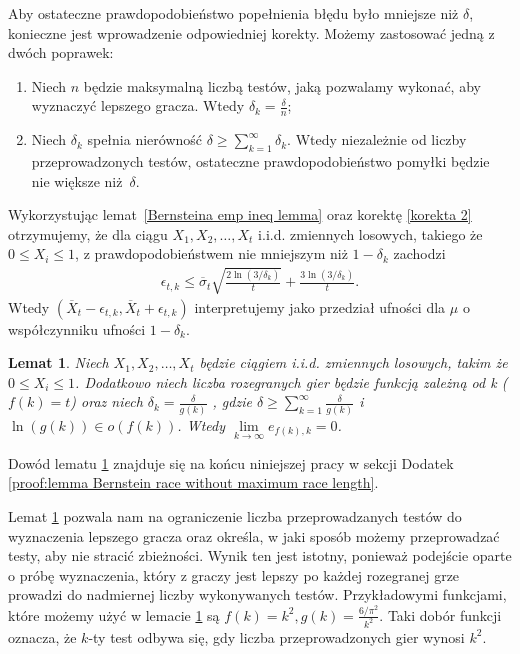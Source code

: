 \documentclass[inzynierska]{pwr_wmat_praca_dyplomowa}
\theoremstyle{plain}
\numberwithin{theorem}{chapter}
\newtheorem{lemma}[theorem]{Lemat}
\theoremstyle{definition}
\numberwithin{theorem}{chapter}
\begin{document}
	Aby ostateczne prawdopodobieństwo popełnienia błędu było mniejsze niż $\delta$, konieczne jest wprowadzenie odpowiedniej korekty.
	Możemy zastosować jedną z dwóch poprawek:
	\begin{enumerate}[label=\thesection.\arabic*]
		\item \label{korekta 1} Niech $n$ będzie maksymalną liczbą testów, jaką pozwalamy wykonać, aby wyznaczyć lepszego
		gracza. Wtedy $\delta_k=\frac{\delta}{n}$;
		\item \label{korekta 2} Niech $\delta_k$ spełnia nierówność $ \delta \ge \sum_{k = 1}^{\infty}\delta_k$. Wtedy niezależnie od
		liczby przeprowadzonych testów, ostateczne
		prawdopodobieństwo pomyłki będzie nie większe niż~$\delta$.
	\end{enumerate}
	Wykorzystując lemat~\ref{Bernsteina emp ineq lemma} oraz korektę \ref{korekta 2} otrzymujemy, że dla ciągu $X_1, X_2, \dots, X_t$ i.i.d. zmiennych losowych, takiego że  $0 \le X_i \le 1$, z prawdopodobieństwem nie mniejszym niż $1-\delta_k$ zachodzi
	\begin{align}
		\label{Bernstein race without maximum race length}
		\epsilon_{t, k} \le \overline{\sigma}_t \sqrt{\frac{2\ln(3/\delta_k)}{t}} + \frac{3  \ln{(3 / \delta_k)}}{t}.
	\end{align}
	Wtedy $(\overline{X}_t - \epsilon_{t,k}, \overline{X}_t + \epsilon_{t,k})$ interpretujemy jako przedział ufności dla $\mu$ o współczynniku ufności $1-\delta_k$.
	\begin{lemma}
		\label{lemma Bernstein race without maximum race length}
		Niech $X_1, X_2, \dots, X_t$ będzie ciągiem i.i.d. zmiennych losowych, takim że  $0 \le X_i \le 1$. Dodatkowo niech liczba rozegranych gier będzie funkcją zależną od k ($f(k) = t$) %
		oraz niech $\delta_k = \frac{\delta}{g(k)}$
		, gdzie $\delta \ge \sum_{k=1}^{\infty} \frac{\delta}{g(k)}$ i $\ln(g(k)) \in o(f(k))$. Wtedy
		$\lim\limits_{k\to\infty} e_{f(k), k} = 0$. 
	\end{lemma}
	\noindent
	Dowód lematu \ref{lemma Bernstein race without maximum race length} znajduje się na końcu niniejszej pracy w sekcji Dodatek	\ref{proof:lemma Bernstein race without maximum race length}.
	
	Lemat \ref{lemma Bernstein race without maximum race length} pozwala nam na ograniczenie liczba przeprowadzanych testów do wyznaczenia lepszego gracza oraz określa, w jaki sposób możemy  przeprowadzać  testy, aby nie stracić zbieżności.
	Wynik ten jest istotny, ponieważ podejście oparte o próbę wyznaczenia, który z graczy jest lepszy po każdej rozegranej grze prowadzi do nadmiernej liczby wykonywanych testów.
	Przykładowymi funkcjami, które możemy użyć w %
	 lemacie \ref{lemma Bernstein race without maximum race length} są $f(k) = k^2, g(k) = \frac{6/\pi^2}{k^2}$. Taki dobór funkcji oznacza, że $k$-ty test odbywa się, gdy liczba przeprowadzonych gier wynosi $k^2$.
\end{document}

